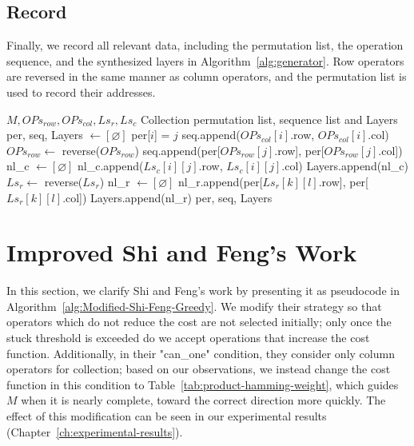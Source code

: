 \subsection{Record}

Finally, we record all relevant data, including the permutation list, the operation sequence, and the synthesized layers in Algorithm~\ref{alg:generator}. Row operators are reversed in the same manner as column operators, and the permutation list is used to record their addresses.

\begin{algorithm}[htbp]
\caption{Generator}
\label{alg:generator}
\begin{algorithmic}[1]
\Require $M, OPs_{row}, OPs_{col}, Ls_{r}, Ls_{c}$
\Ensure Collection permutation list, sequence list and Layers 
\State per, seq, Layers $\leftarrow [\varnothing]$
			\State per[$i$] = $j$
		\EndIf
	\EndFor
\EndFor 
{}
	\State seq.append($OPs_{col}[i]$.row, $OPs_{col}[i]$.col)
\EndFor
\State $OPs_{row} \leftarrow$ reverse($OPs_{row}$)
	\State seq.append(per[$OPs_{row}[j]$.row], per[$OPs_{row}[j]$.col])
\EndFor
{}
	\State nl\_c $\leftarrow [\varnothing]$
		\State nl\_c.append($Ls_{c}[i][j]$.row, $Ls_{c}[i][j]$.col)
	\EndFor
	\State Layers.append(nl\_c)
\EndFor
\State $Ls_{r} \leftarrow$ reverse($Ls_{r}$)
	\State nl\_r $\leftarrow [\varnothing]$
		\State nl\_r.append(per[$Ls_{r}[k][l]$.row], per[$Ls_{r}[k][l]$.col])
	\EndFor
	\State Layers.append(nl\_r)
\EndFor
\State \Return per, seq, Layers
\end{algorithmic}
\end{algorithm}

\section{Improved Shi and Feng's Work}

In this section, we clarify Shi and Feng's work by presenting it as pseudocode in Algorithm~\ref{alg:Modified-Shi-Feng-Greedy}. We modify their strategy so that operators which do not reduce the cost are not selected initially; only once the stuck threshold is exceeded do we accept operations that increase the cost function. Additionally, in their "can\_one" condition, they consider only column operators for collection; based on our observations, we instead change the cost function in this condition to Table~\ref{tab:product-hamming-weight}, which guides $M$ when it is nearly complete, toward the correct direction more quickly. The effect of this modification can be seen in our experimental results (Chapter~\ref{ch:experimental-results}).

